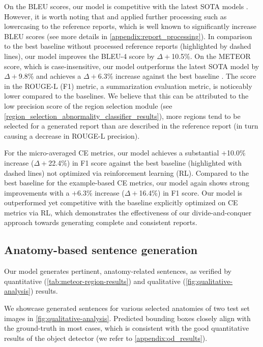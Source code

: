 \documentclass[10pt,twocolumn,letterpaper]{article}
\begin{document}
On the BLEU scores, our model is competitive with the latest SOTA models \cite{wang2022inclusive, nicolson2022improving}. However, it is worth noting that \cite{nicolson2022improving} and \cite{wang2022inclusive} applied further processing such as lowercasing to the reference reports, which is well known to significantly increase BLEU scores \cite{post2018call} (see more details in \cref{appendix:report_processing}). In comparison to the best baseline \cite{miura2021improving} without processed reference reports (highlighted by dashed lines), our model improves the BLEU-4 score by $\Delta+$10.5\%. On the METEOR score, which is case-insensitive, our model outperforms the latest SOTA model \cite{nicolson2022improving} by $\Delta+$9.8\% and achieves a $\Delta+$6.3\% increase against the best baseline \cite{you2021aligntransformer}. The score in the ROUGE-L (F1) metric, a summarization evaluation metric, is noticeably lower compared to the baselines. We believe that this can be attributed to the low precision score of the region selection module (see \cref{region_selection_abnormality_classifier_results}), \ie more regions tend to be selected for a generated report than are described in the reference report (in turn causing a decrease in ROUGE-L precision).

For the micro-averaged CE metrics, our model achieves a substantial $+$10.0\% increase ($\Delta+$22.4\%) in F1 score against the best baseline \cite{miura2021improving} (highlighted with dashed lines) not optimized via reinforcement learning (RL). Compared to the best baseline for the example-based CE metrics, our model again shows strong improvements with a $+$6.3\% increase ($\Delta+$16.4\%) in F1 score. Our model is outperformed yet competitive with the baseline \cite{miura2021improving} explicitly optimized on CE metrics via RL, which demonstrates the effectiveness of our divide-and-conquer approach towards generating complete and consistent reports. 

\subsection{Anatomy-based sentence generation}

Our model generates pertinent, anatomy-related sentences, as verified by quantitative (\cref{tab:meteor-region-results}) and qualitative (\cref{fig:qualitative-analysis}) results.

We showcase generated sentences for various selected anatomies of two test set images in \cref{fig:qualitative-analysis}. Predicted bounding boxes closely align with the ground-truth in most cases, which is consistent with the good quantitative results of the object detector (we refer to \cref{appendix:od_results}).
\end{document}
